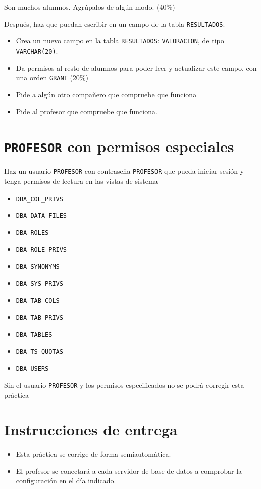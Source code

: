 \documentclass[a4paper]{article}
\begin{document}
\begin{Aviso}
Son muchos alumnos. Agrúpalos de algún modo. (40\%)
\end{Aviso}

Después, haz que puedan escribir en un campo de la tabla \texttt{RESULTADOS}:
\begin{itemize}
\item Crea un nuevo campo en la tabla \texttt{RESULTADOS}: \texttt{VALORACION}, de tipo \texttt{VARCHAR(20)}.
\item Da permisos al resto de alumnos para poder leer y actualizar este campo, con una orden \texttt{GRANT} (20\%)
\item Pide a algún otro compañero que compruebe que funciona
\item Pide al profesor que compruebe que funciona.
\end{itemize}
\section{\texttt{PROFESOR} con permisos especiales}
\label{sec:org000000f}
Haz un usuario \texttt{PROFESOR} con contraseña \texttt{PROFESOR} que pueda iniciar sesión y tenga permisos de lectura en las vistas de sistema
\begin{itemize}
\item \texttt{DBA\_COL\_PRIVS}
\item \texttt{DBA\_DATA\_FILES}
\item \texttt{DBA\_ROLES}
\item \texttt{DBA\_ROLE\_PRIVS}
\item \texttt{DBA\_SYNONYMS}
\item \texttt{DBA\_SYS\_PRIVS}
\item \texttt{DBA\_TAB\_COLS}
\item \texttt{DBA\_TAB\_PRIVS}
\item \texttt{DBA\_TABLES}
\item \texttt{DBA\_TS\_QUOTAS}
\item \texttt{DBA\_USERS}
\end{itemize}


\begin{Aviso}
Sin el usuario \texttt{PROFESOR} y los permisos especificados no se podrá corregir esta práctica
\end{Aviso}
\section*{Instrucciones de entrega}
\label{sec:org0000012}
\begin{itemize}
\item Esta práctica se corrige de forma semiautomática.
\item El profesor se conectará a cada servidor de base de datos a comprobar la configuración en el día indicado.
\end{itemize}
\end{document}
